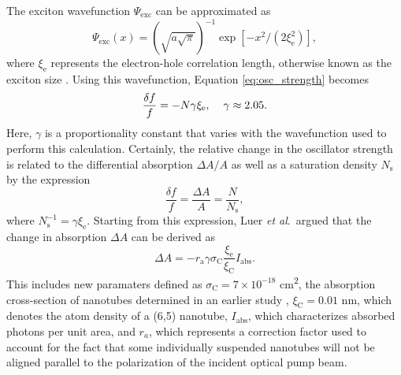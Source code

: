 The exciton wavefunction $\Psi_\text{exc}$ can be approximated as
\begin{equation}
	\Psi_\text{exc}(x) = \left( \sqrt{a \sqrt{\pi}} \right)^{-1} \exp[-x^2 / (2 \xi^2_\text{e})],
\end{equation}
where $\xi_\text{e}$ represents the electron-hole correlation length, otherwise known as the exciton size \cite{capaz2006diameter}. Using this wavefunction, Equation \eqref{eq:osc_strength} becomes
%
\begin{equation}
	\frac{\delta f}{f} = - N \gamma \xi_\text{e}, \hspace{4mm} \gamma \approx 2.05.
\end{equation}
%
Here, $\gamma$ is a proportionality constant that varies with the wavefunction used to perform this calculation. Certainly, the relative change in the oscillator strength is related to the differential absorption $\Delta A / A$ as well as a saturation density $N_\text{s}$ by the expression
\begin{equation}
	\frac{\delta f}{f} = \frac{\Delta A}{A} = \frac{N}{N_\text{s}},
\end{equation}
where $N_\text{s}^{-1} = \gamma \xi_\text{e}$. Starting from this expression, Luer \textit{et al}.\ argued that the change in absorption $\Delta A$ can be derived as
\begin{equation}
	\Delta A = -r_\text{a} \gamma \sigma_\text{C} \frac{\xi_\text{e}}{\xi_\text{C}} I_\text{abs}.
	\label{eq:abs_exc_len}
\end{equation}
This includes new paramaters defined as $\sigma_\text{C} = 7 \times 10^{-18}$ \si{\cm\squared}, the absorption cross-section of nanotubes determined in an earlier study \cite{zheng2004solution}, $\xi_\text{C} = 0.01$ nm, which denotes the atom density of a (6,5) nanotube, $I_\text{abs}$, which characterizes absorbed photons per unit area, and $r_{a}$, which represents a correction factor used to account for the fact that some individually suspended nanotubes will not be aligned parallel to the polarization of the incident optical pump beam.

